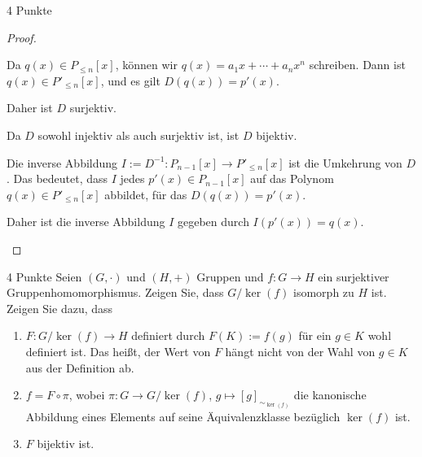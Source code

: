 \documentclass{problemset}
\begin{document}
\begin{problem}{4 Punkte}
\begin{proof}
\begin{enumerate}
              Da $q(x) \in P_{\le n}[x]$, können wir $q(x) = a_1x + \cdots + a_nx^n$
              schreiben. Dann ist $q(x) \in P'_{\le n}[x]$, und es gilt $D(q(x)) = p'(x)$.

              Daher ist $D$ surjektiv. \checkmark

              Da $D$ sowohl injektiv als auch surjektiv ist, ist $D$ bijektiv.

              Die inverse Abbildung $I := D^{-1}: P_{n-1}[x] \to P'_{\le n}[x]$ ist die
              Umkehrung von $D$. Das bedeutet, dass $I$ jedes $p'(x) \in P_{n-1}[x]$ auf das
              Polynom $q(x) \in P'_{\le n}[x]$ abbildet, für das $D(q(x)) = p'(x)$.

              Daher ist die inverse Abbildung $I$ gegeben durch $I(p'(x)) = q(x)$.
    \end{enumerate}
\end{proof}

\end{problem}

\begin{problem}{4 Punkte}
Seien $(G, \cdot)$ und $(H, +)$ Gruppen und $f: G \to H$ ein surjektiver
Gruppenhomomorphismus. Zeigen Sie, dass $G/\ker(f)$ isomorph zu $H$ ist. Zeigen
Sie dazu, dass
\begin{enumerate}
    \item $F: G/\ker(f) \to H$ definiert durch $F(K) := f(g)$ für ein $g \in K$ wohl definiert ist. Das heißt, der Wert von $F$ hängt nicht von der Wahl von $g \in K$ aus der Definition ab.
    \item $f = F \circ \pi$, wobei $\pi: G \to G/\ker(f)$, $g \mapsto [g]_{\sim_{\ker(f)}}$ die kanonische Abbildung eines Elements auf seine Äquivalenzklasse bezüglich $\ker(f)$ ist.
    \item $F$ bijektiv ist.
\end{enumerate}

\end{problem}
\end{document}
